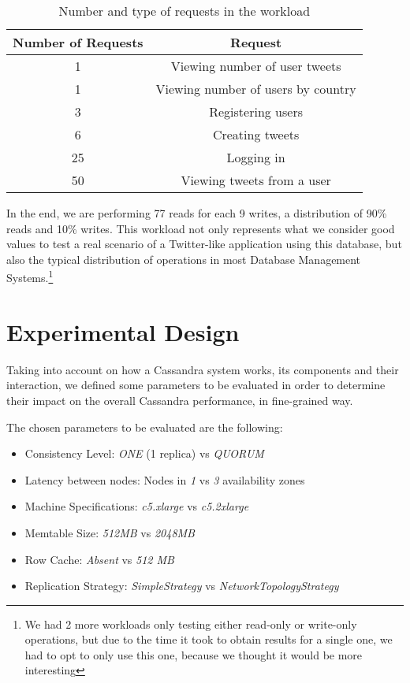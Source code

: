 \documentclass[runningheads]{llncs}
\begin{document}
\begin{table}
  \caption{Number and type of requests in the workload}
  \centering
  \begin{tabular}{|c|c|}
     \hline
          Number of Requests & Request \\
     \hline
      1 & Viewing number of user tweets \\
      1 & Viewing number of users by country \\
      3 & Registering users \\
      6 & Creating tweets \\
     25 & Logging in \\
     50 & Viewing tweets from a user \\
     \hline
  \end{tabular}
  \label{Tab:ratios}
\end{table}

In the end, we are performing 77 reads for each 9 writes, a distribution of 90\% reads and 10\% writes. This workload not only represents what we consider good values to test a real scenario of a Twitter-like application using this database, but also the typical distribution of operations in most Database Management Systems.\footnote{We had 2 more workloads only testing either read-only or write-only operations, but due to the time it took to obtain results for a single one, we had to opt to only use this one, because we thought it would be more interesting}


\section{Experimental Design}

Taking into account on how a Cassandra system works, its components and their interaction, we defined some parameters to be evaluated in order to determine their impact on the overall Cassandra performance, in fine-grained way.

The chosen parameters to be evaluated are the following:

\begin{itemize}
    \item Consistency Level: \emph{ONE} (1 replica) vs \emph{QUORUM}
    \item Latency between nodes: Nodes in \emph{1} vs \emph{3} availability zones
    \item Machine Specifications: \emph{c5.xlarge} vs \emph{c5.2xlarge}
    \item Memtable Size: \emph{512MB} vs \emph{2048MB}
    \item Row Cache: \emph{Absent} vs \emph{512 MB}
    \item Replication Strategy: \emph{SimpleStrategy} vs \emph{NetworkTopologyStrategy}
\end{itemize}
\end{document}
